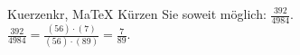 \begin{MAufgabe}{Kuerzen}{kr, MaTeX}
K\"urzen Sie soweit m\"oglich: $\frac{392}{4984}$.\\ 
\ifLsg\MLoesung
\quad $\frac{392}{4984}=\frac{(56)\cdot(7)}{(56)\cdot(89)}=\frac{7}{89}$.\else\relax\fi
 \end{MAufgabe}